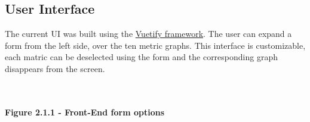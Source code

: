 \documentclass[12pt,hidelinks]{article}
\begin{document}
\subsection{User Interface}

The current UI was built using the \href{https://vuetifyjs.com/en/}{Vuetify framework}. The user can expand a form from the left side, over the ten metric graphs. 
This interface is customizable, each matric can be deselected using the form and the corresponding graph disappears from the screen. \\
\\  
\begin{center}
 \\
\textbf{Figure 2.1.1 - Front-End form options}
\end{center}
\end{document}

